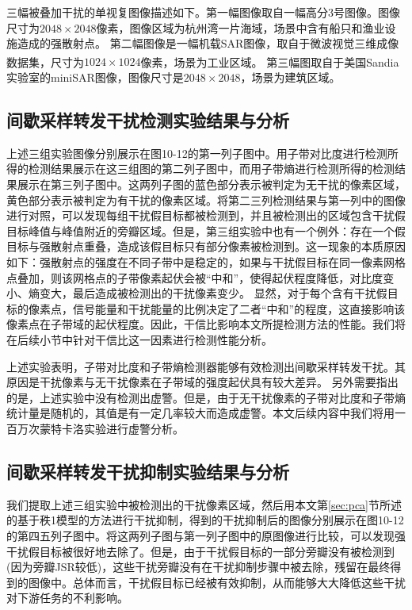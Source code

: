 \documentclass[10.5pt,UTF8]{JR}
\theoremstyle{mystyle}
\newcommand{\upcite}[1]{\textsuperscript{\cite{#1}}}
\begin{document}
三幅被叠加干扰的单视复图像描述如下。第一幅图像取自一幅高分3号图像。图像尺寸为$2048 \times 2048$像素，图像区域为杭州湾一片海域，场景中含有船只和渔业设施造成的强散射点。
第二幅图像是一幅机载SAR图像，取自于微波视觉三维成像数据集\upcite{qiu2021sarmv3d}，尺寸为$1024\times 1024$像素，场景为工业区域。
第三幅图取自于美国Sandia实验室的miniSAR图像，图像尺寸是$2048\times 2048$，场景为建筑区域。



\subsection{间歇采样转发干扰检测实验结果与分析}

上述三组实验图像分别展示在图10-12的第一列子图中。用子带对比度进行检测所得的检测结果展示在这三组图的第二列子图中，而用子带熵进行检测所得的检测结果展示在第三列子图中。这两列子图的蓝色部分表示被判定为无干扰的像素区域，黄色部分表示被判定为有干扰的像素区域。将第二三列检测结果与第一列中的图像进行对照，可以发现每组干扰假目标都被检测到，并且被检测出的区域包含干扰假目标峰值与峰值附近的旁瓣区域。但是，第三组实验中也有一个例外：存在一个假目标与强散射点重叠，造成该假目标只有部分像素被检测到。这一现象的本质原因如下：强散射点的强度在不同子带中是稳定的，如果与干扰假目标在同一像素网格点叠加，则该网格点的子带像素起伏会被“中和”，使得起伏程度降低，对比度变小、熵变大，最后造成被检测出的干扰像素变少。
显然，对于每个含有干扰假目标的像素点，信号能量和干扰能量的比例决定了二者“中和”的程度，这直接影响该像素点在子带域的起伏程度。因此，干信比影响本文所提检测方法的性能。我们将在后续小节中针对干信比这一因素进行检测性能分析。

上述实验表明，子带对比度和子带熵检测器能够有效检测出间歇采样转发干扰。其原因是干扰像素与无干扰像素在子带域的强度起伏具有较大差异。
另外需要指出的是，上述实验中没有检测出虚警。但是，由于无干扰像素的子带对比度和子带熵统计量是随机的，其值是有一定几率较大而造成虚警。本文后续内容中我们将用一百万次蒙特卡洛实验进行虚警分析。

\subsection{间歇采样转发干扰抑制实验结果与分析}

我们提取上述三组实验中被检测出的干扰像素区域，然后用本文第\ref{sec:pca}节所述的基于秩1模型的方法进行干扰抑制，得到的干扰抑制后的图像分别展示在图10-12的第四五列子图中。将这两列子图与第一列子图中的原图像进行比较，可以发现强干扰假目标被很好地去除了。但是，由于干扰假目标的一部分旁瓣没有被检测到(因为旁瓣JSR较低)，这些干扰旁瓣没有在干扰抑制步骤中被去除，残留在最终得到的图像中。总体而言，干扰假目标已经被有效抑制，从而能够大大降低这些干扰对下游任务的不利影响。
\end{document}
